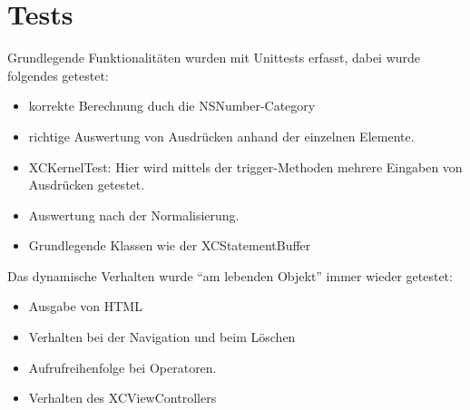 \chapter{Tests}
Grundlegende Funktionalitäten wurden mit Unittests erfasst, dabei wurde folgendes getestet:
\begin{itemize}
	\item korrekte Berechnung duch die NSNumber-Category
	\item richtige Auswertung von Ausdrücken anhand der einzelnen Elemente.
	\item XCKernelTest: Hier wird mittels der trigger-Methoden mehrere Eingaben von Ausdrücken getestet.
	\item Auswertung nach der Normalisierung.
	\item Grundlegende Klassen wie der XCStatementBuffer
\end{itemize}
Das dynamische Verhalten wurde ``am lebenden Objekt'' immer wieder getestet:
\begin{itemize}
	\item Ausgabe von HTML
	\item Verhalten bei der Navigation und beim Löschen
	\item Aufrufreihenfolge bei Operatoren.
	\item Verhalten des XCViewControllers
\end{itemize}
